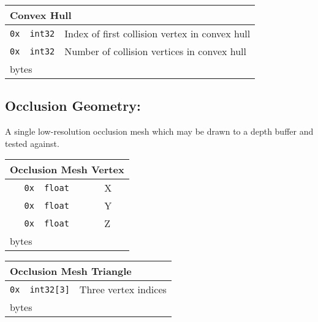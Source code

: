 \documentclass{article}
\newcounter{filebytecounter}
\newenvironment{filestruct}[1]{
	\setcounter{filebytecounter}{0}
	\begin{center}
	\begin{tabular*}{0.85\textwidth}{r|l|l}
	\multicolumn{3}{l}{\textbf{#1}}\\
	\hline
}{
	\hline
	\multicolumn{3}{l}{\decimal{filebytecounter} bytes}\\
	\hline
	\end{tabular*}
	\end{center}
}
\newcommand{\fileitem}[3]{
	\texttt{0x\padzeroes[2]\Hexadecimal{filebytecounter}}\addtocounter{filebytecounter}{#1} & \texttt{#2} & {#3} \\
}
\begin{document}
\begin{filestruct}{Convex Hull}
	\fileitem{4}{int32}{Index of first collision vertex in convex hull}
	\fileitem{4}{int32}{Number of collision vertices in convex hull}
\end{filestruct}

\subsection{Occlusion Geometry:}
A single low-resolution occlusion mesh which may be drawn to a depth buffer and tested against.

\begin{filestruct}{Occlusion Mesh Vertex}
	\fileitem{4}{float}{X}
	\fileitem{4}{float}{Y}
	\fileitem{4}{float}{Z}
\end{filestruct}

\begin{filestruct}{Occlusion Mesh Triangle}
	\fileitem{12}{int32[3]}{Three vertex indices}
\end{filestruct}
\end{document}
